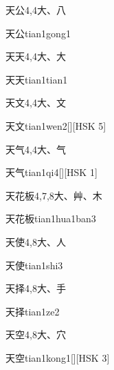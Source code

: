 \begin{entry}{天公}{4,4}{⼤、⼋}
  \begin{phonetics}{天公}{tian1gong1}
  \end{phonetics}
\end{entry}

\begin{entry}{天天}{4,4}{⼤、⼤}
  \begin{phonetics}{天天}{tian1tian1}
  \end{phonetics}
\end{entry}

\begin{entry}{天文}{4,4}{⼤、⽂}
  \begin{phonetics}{天文}{tian1wen2}[][HSK 5]
  \end{phonetics}
\end{entry}

\begin{entry}{天气}{4,4}{⼤、⽓}
  \begin{phonetics}{天气}{tian1qi4}[][HSK 1]
  \end{phonetics}
\end{entry}

\begin{entry}{天花板}{4,7,8}{⼤、⾋、⽊}
  \begin{phonetics}{天花板}{tian1hua1ban3}
  \end{phonetics}
\end{entry}

\begin{entry}{天使}{4,8}{⼤、⼈}
  \begin{phonetics}{天使}{tian1shi3}
  \end{phonetics}
\end{entry}

\begin{entry}{天择}{4,8}{⼤、⼿}
  \begin{phonetics}{天择}{tian1ze2}
  \end{phonetics}
\end{entry}

\begin{entry}{天空}{4,8}{⼤、⽳}
  \begin{phonetics}{天空}{tian1kong1}[][HSK 3]
  \end{phonetics}
\end{entry}

